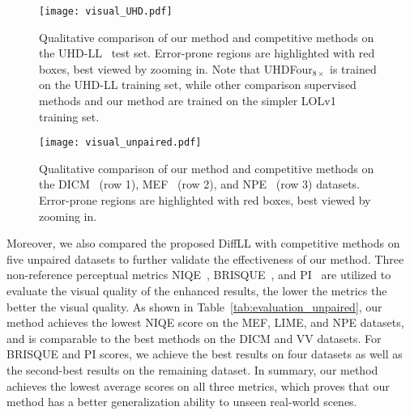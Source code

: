 \begin{figure*}[!t]
	\centering
	\texttt{[image: visual\_UHD.pdf]}
	\caption{Qualitative comparison of our method and competitive methods on the UHD-LL~\cite{UHD_ICLR} test set. Error-prone regions are highlighted with red boxes, best viewed by zooming in. Note that UHDFour$_{8\times}$ is trained on the UHD-LL training set, while other comparison supervised methods and our method are trained on the simpler LOLv1~\cite{RetinexNet} training set.}
	\label{fig:visual_UHD}
\end{figure*}
\begin{figure*}[!t]
	\centering
	\texttt{[image: visual\_unpaired.pdf]}
	\caption{Qualitative comparison of our method and competitive methods on the DICM~\cite{DICM} (row 1), MEF~\cite{MEF} (row 2), and NPE~\cite{NPE} (row 3) datasets. Error-prone regions are highlighted with red boxes, best viewed by zooming in.}
	\label{fig:visual_compare_unpaired}
\end{figure*}

Moreover, we also compared the proposed DiffLL with competitive methods on five unpaired datasets to further validate the effectiveness of our method. Three non-reference perceptual metrics NIQE~\cite{NIQE}, BRISQUE~\cite{BRISQUE}, and PI~\cite{PI} are utilized to evaluate the visual quality of the enhanced results, the lower the metrics the better the visual quality. As shown in Table~\ref{tab:evaluation_unpaired}, our method achieves the lowest NIQE score on the MEF, LIME, and NPE datasets, and is comparable to the best methods on the DICM and VV datasets. For BRISQUE and PI scores, we achieve the best results on four datasets as well as the second-best results on the remaining dataset. In summary, our method achieves the lowest average scores on all three metrics, which proves that our method has a better generalization ability to unseen real-world scenes.

